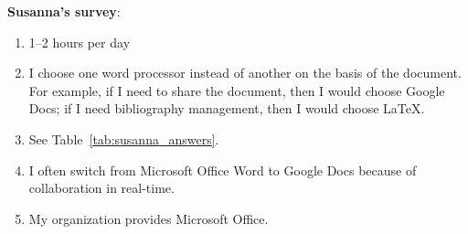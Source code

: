 \documentclass[a4paper,11pt]{article}
\begin{document}
\noindent \textbf{Susanna's survey}:

\begin{enumerate}
    \item 1–2 hours per day
    \item I choose one word processor instead of another on the basis of the document. For example, if I need to share the document, then I would choose Google Docs; if I need bibliography management, then I would choose LaTeX.
    \item See Table~\ref{tab:susanna_answers}.
        \begin{table}[h]
        \centering
        \caption{Results}
        \label{tab:susanna_answers}
        \end{table}
    \item I often switch from Microsoft Office Word to Google Docs because of collaboration in real-time.
    \item My organization provides Microsoft Office.
\end{enumerate}
\end{document}
